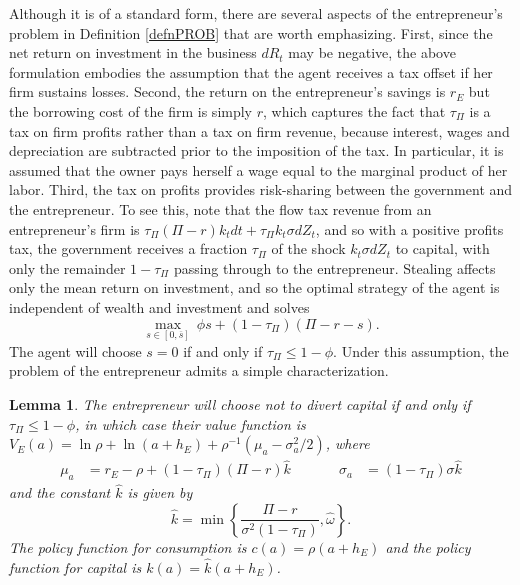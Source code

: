 \documentclass[11pt]{article}
\theoremstyle{plain}
\newtheorem{lemma}[thm]{Lemma}
\theoremstyle{definition} %
\begin{document}
Although it is of a standard form, there are several aspects of the entrepreneur's problem in Definition \ref{defnPROB} that are worth emphasizing. First, since the net return on investment in the business $dR_t$ may be negative, the above formulation embodies the assumption that the agent receives a tax offset if her firm sustains losses. Second, the return on the entrepreneur's savings is $r_E$ but the borrowing cost of the firm is simply $r$, which captures the fact that $\tau_{\Pi}$ is a tax on firm profits rather than a tax on firm revenue, because interest, wages and depreciation are subtracted prior to the imposition of the tax. In particular, it is assumed that the owner pays herself a wage equal to the marginal product of her labor. Third, the tax on profits provides risk-sharing between the government and the entrepreneur. To see this, note that the flow tax revenue from an entrepreneur's firm is $\tau_{\Pi}(\Pi - r)k_tdt + \tau_{\Pi}k_t\sigma dZ_t$, and so with a positive profits tax, the government receives a fraction $\tau_{\Pi}$ of the shock $k_t\sigma dZ_t$ to capital, with only the remainder $1 - \tau_{\Pi}$ passing through to the entrepreneur. Stealing affects only the mean return on investment, and so the optimal strategy of the agent is independent of wealth and investment and solves 
$$
\max_{s \in [0,\overline{s}]}\ \phi s + (1-\tau_{\Pi})(\Pi - r - s).
$$
The agent will choose $s=0$ if and only if $\tau_{\Pi} \leq 1 - \phi$. Under this assumption, the problem of the entrepreneur admits a simple characterization. 

\begin{lemma} \label{agentprobLEMMA}
The entrepreneur will choose not to divert capital if and only if $\tau_{\Pi} \leq 1-\phi$, in which case their value function is $V_E(a) = \ln \rho + \ln{\left(a + h_E\right)} + \rho^{-1} {\left(\mu_a - \sigma_a^2/2\right)}$, where 
\begin{equation}
\begin{aligned}
\mu_a & = r_E - \rho + (1-\tau_{\Pi}) (\Pi - r) \hat{k} 
\ \ \ \ \ \ & \ \ \ \ \ \ \sigma_a & = (1-\tau_{\Pi}) \sigma \hat{k} 
\label{phiMU}
\end{aligned}
\end{equation} 
and the constant $\hat{k}$ is given by
$$
\hat{k} = \min{\left\{ \frac{\Pi - r}{\sigma^2(1-\tau_{\Pi})}, \hat{\omega}\right\}}.
$$ %
The policy function for consumption is $c(a) = \rho (a + h_E)$ and the policy function for capital is $k(a) = \hat{k}(a + h_E)$. 
\end{lemma}
\end{document}
